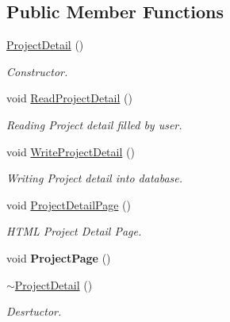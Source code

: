 \subsection*{Public Member Functions}
\begin{DoxyCompactItemize}
\item 
\hypertarget{classProjectDetail_a405e8bbc157e30c4ff93871988218d9f}{\hyperlink{classProjectDetail_a405e8bbc157e30c4ff93871988218d9f}{Project\-Detail} ()}\label{classProjectDetail_a405e8bbc157e30c4ff93871988218d9f}

\begin{DoxyCompactList}\small\item\em Constructor. \end{DoxyCompactList}\item 
\hypertarget{classProjectDetail_adb90a2d734932eaa299887f2a0f7a4f0}{void \hyperlink{classProjectDetail_adb90a2d734932eaa299887f2a0f7a4f0}{Read\-Project\-Detail} ()}\label{classProjectDetail_adb90a2d734932eaa299887f2a0f7a4f0}

\begin{DoxyCompactList}\small\item\em Reading Project detail filled by user. \end{DoxyCompactList}\item 
\hypertarget{classProjectDetail_aead21e43d205260a59c75fbc5c75f14b}{void \hyperlink{classProjectDetail_aead21e43d205260a59c75fbc5c75f14b}{Write\-Project\-Detail} ()}\label{classProjectDetail_aead21e43d205260a59c75fbc5c75f14b}

\begin{DoxyCompactList}\small\item\em Writing Project detail into database. \end{DoxyCompactList}\item 
\hypertarget{classProjectDetail_ade1395ab7aed2603464d81c3c352e716}{void \hyperlink{classProjectDetail_ade1395ab7aed2603464d81c3c352e716}{Project\-Detail\-Page} ()}\label{classProjectDetail_ade1395ab7aed2603464d81c3c352e716}

\begin{DoxyCompactList}\small\item\em H\-T\-M\-L Project Detail Page. \end{DoxyCompactList}\item 
\hypertarget{classProjectDetail_a015ec9a9582537b8d98b953c27ba26ec}{void {\bfseries Project\-Page} ()}\label{classProjectDetail_a015ec9a9582537b8d98b953c27ba26ec}

\item 
\hypertarget{classProjectDetail_ab4719d14d9efb8811916f5d691099c8f}{\hyperlink{classProjectDetail_ab4719d14d9efb8811916f5d691099c8f}{$\sim$\-Project\-Detail} ()}\label{classProjectDetail_ab4719d14d9efb8811916f5d691099c8f}

\begin{DoxyCompactList}\small\item\em Desrtuctor. \end{DoxyCompactList}\end{DoxyCompactItemize}
